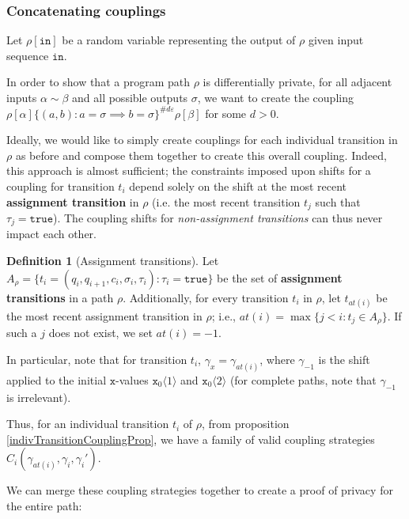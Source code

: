 \documentclass[12pt]{article}
\newcommand{\brangle}[1]{\langle #1 \rangle}
\theoremstyle{definition}
\newtheorem{defn}[thm]{Definition}
\begin{document}
\subsubsection{Concatenating couplings}

Let $\rho[\texttt{in}]$ be a random variable representing the output of $\rho$ given input sequence $\texttt{in}$. 

In order to show that a program path $\rho$ is differentially private, for all adjacent inputs $\alpha\sim\beta$ and all possible outputs $\sigma$, we want to create the coupling $\rho[\alpha]\{(a, b): a=\sigma\implies b=\sigma\}^{\#d\varepsilon}\rho[\beta]$ for some $d>0$. 

Ideally, we would like to simply create couplings for each individual transition in $\rho$ as before and compose them together to create this overall coupling. Indeed, this approach is almost sufficient; the constraints imposed upon shifts for a coupling for transition $t_i$ depend solely on the shift at the most recent \textbf{assignment transition} in $\rho$ (i.e. the most recent transition $t_j$ such that $\tau_j = \texttt{true}$). 
The coupling shifts for \textit{non-assignment transitions} can thus never impact each other. 

\begin{defn}[Assignment transitions]
    Let $A_\rho = \{t_i=(q_i, q_{i+1}, c_i, \sigma_i, \tau_i): \tau_i = \texttt{true}\}$ be the set of \textbf{assignment transitions} in a path $\rho$. Additionally, for every transition $t_i$ in $\rho$, let $t_{at(i)}$ be the most recent assignment transition in $\rho$; i.e., $at(i) = \max\{j<i: t_j\in A_\rho\}$. If such a $j$ does not exist, we set $at(i)=-1$. 
\end{defn}

In particular, note that for transition $t_i$, $\gamma_x = \gamma_{at(i)}$, where $\gamma_{-1}$ is the shift applied to the initial $\texttt{x}$-values $\texttt{x}_0\brangle{1}$ and $\texttt{x}_0\brangle{2}$ (for complete paths, note that $\gamma_{-1}$ is irrelevant).

Thus, for an individual transition $t_i$ of $\rho$, from proposition \ref{indivTransitionCouplingProp}, we have a family of valid coupling strategies $C_i(\gamma_{at(i)}, \gamma_i, \gamma_i')$. 

We can merge these coupling strategies together to create a proof of privacy for the entire path: 
\end{document}
